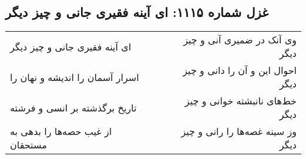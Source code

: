 \begin{center}
\section*{غزل شماره ۱۱۱۵: ای آینه فقیری جانی و چیز دیگر}
\label{sec:1115}
\begin{longtable}{l p{0.5cm} r}
ای آینه فقیری جانی و چیز دیگر
&&
وی آنک در ضمیری آنی و چیز دیگر
\\
اسرار آسمان را اندیشه و نهان را
&&
احوال این و آن را دانی و چیز دیگر
\\
تاریخ برگذشته بر انسی و فرشته
&&
خط‌های نانبشته خوانی و چیز دیگر
\\
از غیب حصه‌ها را بدهی به مستحقان
&&
وز سینه غصه‌ها را رانی و چیز دیگر
\\
\end{longtable}
\end{center}
